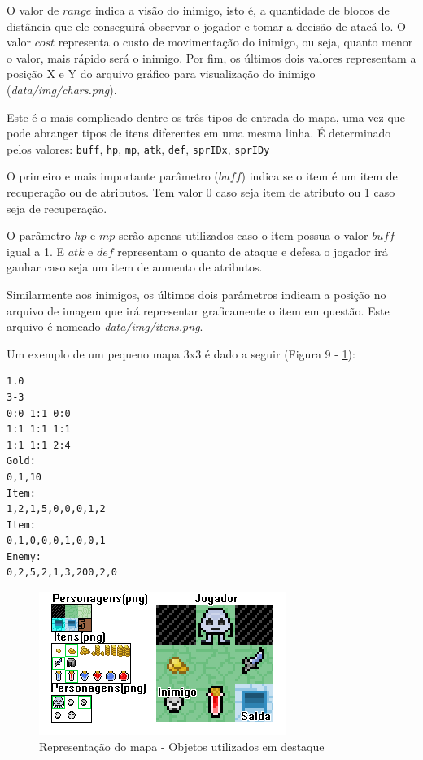 O valor de $range$ indica a visão do inimigo, isto é, a quantidade de blocos de distância que ele conseguirá observar o jogador e tomar a decisão de atacá-lo.
O valor $cost$ representa o custo de movimentação do inimigo, ou seja, quanto menor o valor, mais rápido será o inimigo.
Por fim, os últimos dois valores representam a posição X e Y do arquivo gráfico para visualização do inimigo (\textit{data/img/chars.png}).

Este é o mais complicado dentre os três tipos de entrada do mapa, uma vez que pode abranger tipos de itens diferentes em uma mesma linha.
É determinado pelos valores: \texttt{buff}, \texttt{hp}, \texttt{mp}, \texttt{atk}, \texttt{def}, \texttt{sprIDx}, \texttt{sprIDy}

O primeiro e mais importante parâmetro ($buff$) indica se o item é um item de recuperação ou de atributos. Tem valor 0 caso seja item de atributo ou 1 caso seja de recuperação.

O parâmetro $hp$ e $mp$ serão apenas utilizados caso o item possua o valor $buff$ igual a 1. E $atk$ e $def$ representam o quanto de ataque e defesa o jogador irá ganhar caso seja um item de aumento de atributos. 

Similarmente aos inimigos, os últimos dois parâmetros indicam a posição no arquivo de imagem que irá representar graficamente o item em questão. Este arquivo é nomeado \textit{data/img/itens.png}.

Um exemplo de um pequeno mapa 3x3 é dado a seguir (Figura 9 - \ref{fig09}):
\begin{verbatim}
1.0
3-3
0:0 1:1 0:0
1:1 1:1 1:1
1:1	1:1 2:4
Gold:
0,1,10
Item:
1,2,1,5,0,0,0,1,2
Item:
0,1,0,0,0,1,0,0,1
Enemy: 
0,2,5,2,1,3,200,2,0
\end{verbatim}
\begin{figure}[h]
	\centering
	\label{fig09}
		\includegraphics[keepaspectratio=true,scale=0.8]{figuras/fig09-map2.png}
	\caption{Representação do mapa - Objetos utilizados em destaque}
\end{figure}

